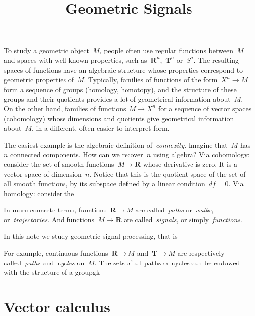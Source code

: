 \title{Geometric Signals}



\newcommand{\1}{\mathbf{1}}
\newcommand{\R}{\mathbf{R}}
\newcommand{\T}{\mathbf{T}}

To study a geometric object~$M$, people often use regular functions
between~$M$ and spaces with well-known properties, such as~$\R^n$,~$\T^n$
or~$S^n$.  The resulting spaces of functions have an algebraic structure
whose properties correspond to geometric properties of~$M$.  Typically,
families of functions of the form~$X^n\to M$ form a sequence of groups
(homology, homotopy), and the structure of these groups and their quotients
provides a lot of geometrical information about~$M$.  On the other hand,
families of functions~$M\to X^n$ for a sequence of vector spaces
(cohomology) whose dimensions and quotients give geometrical information
about~$M$, in a different, often easier to interpret form.

The easiest example is the algebraic definition of~\emph{connexity}.  Imagine
that~$M$ has~$n$ connected components.  How can we recover~$n$ using algebra?
%
Via cohomology: consider the set of smooth functions~$M\to\R$ whose
derivative is zero.  It is a vector space of dimension~$n$.
Notice that this is the quotient space of the set of all smooth functions,
by its subspace defined by a linear condition~$df=0$.
%
Via homology: consider the

In more concrete terms, functions~$\R\to M$ are called~\emph{paths}
or~\emph{walks}, or~\emph{trajectories}.  And functions~$M\to\R$ are
called~\emph{signals}, or simply~\emph{functions}.

In this note we study geometric signal processing, that is


For
example, continuous functions~$\R\to M$ and~$\T\to M$ are respectively
called~\emph{paths} and~\emph{cycles} on~$M$.  The sets of all paths or
cycles can be endowed with the structure of a groupgk



\section{Vector calculus}





